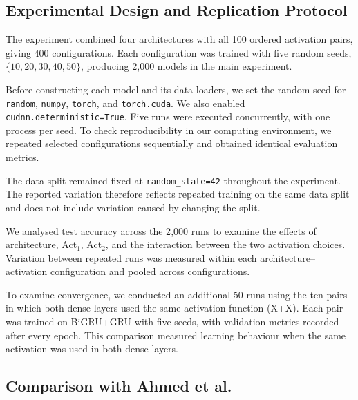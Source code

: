 \documentclass[conference,a4paper]{IEEEtran}
\begin{document}
\subsection{Experimental Design and Replication Protocol}
\label{sec:replication}

The experiment combined four architectures with all
100 ordered activation pairs, giving 400 configurations.
Each configuration was trained with five random seeds,
$\{10,20,30,40,50\}$, producing 2{,}000 models in the
main experiment.

Before constructing each model and its data loaders,
we set the random seed for \texttt{random},
\texttt{numpy}, \texttt{torch}, and \texttt{torch.cuda}.
We also enabled \texttt{cudnn.deterministic=True}.
Five runs were executed concurrently, with one process
per seed. To check reproducibility in our computing
environment, we repeated selected configurations
sequentially and obtained identical evaluation metrics.

The data split remained fixed at
\texttt{random\_state=42} throughout the experiment.
The reported variation therefore reflects repeated
training on the same data split and does not include
variation caused by changing the split.

We analysed test accuracy across the 2{,}000 runs to
examine the effects of architecture, Act$_1$, Act$_2$,
and the interaction between the two activation choices.
Variation between repeated runs was measured within
each architecture--activation configuration and pooled
across configurations.


To examine convergence, we conducted an additional
50 runs using the ten pairs in which both dense layers
used the same activation function (X+X). Each pair was
trained on BiGRU+GRU with five seeds, with validation
metrics recorded after every epoch. This comparison
measured learning behaviour when the same activation
was used in both dense layers.

\subsection{Comparison with Ahmed et al.}
\label{sec:baseline_repro}
\end{document}
